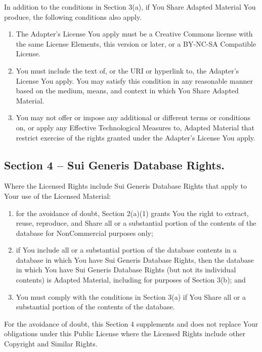 \documentclass[]{book}
\begin{document}
In addition to the conditions in Section 3(a), if You Share Adapted
Material You produce, the following conditions also apply.

\begin{enumerate}
\def\labelenumi{\arabic{enumi}.}
\item
  The Adapter's License You apply must be a Creative Commons license
  with the same License Elements, this version or later, or a BY-NC-SA
  Compatible License.
\item
  You must include the text of, or the URI or hyperlink to, the
  Adapter's License You apply. You may satisfy this condition in any
  reasonable manner based on the medium, means, and context in which You
  Share Adapted Material.
\item
  You may not offer or impose any additional or different terms or
  conditions on, or apply any Effective Technological Measures to,
  Adapted Material that restrict exercise of the rights granted under
  the Adapter's License You apply.
\end{enumerate}

\subsection{Section 4 -- Sui Generis Database
Rights.}\label{section-4-sui-generis-database-rights.}

Where the Licensed Rights include Sui Generis Database Rights that apply
to Your use of the Licensed Material:

\begin{enumerate}
\def\labelenumi{\alph{enumi}.}
\item
  for the avoidance of doubt, Section 2(a)(1) grants You the right to
  extract, reuse, reproduce, and Share all or a substantial portion of
  the contents of the database for NonCommercial purposes only;
\item
  if You include all or a substantial portion of the database contents
  in a database in which You have Sui Generis Database Rights, then the
  database in which You have Sui Generis Database Rights (but not its
  individual contents) is Adapted Material, including for purposes of
  Section 3(b); and
\item
  You must comply with the conditions in Section 3(a) if You Share all
  or a substantial portion of the contents of the database.
\end{enumerate}

For the avoidance of doubt, this Section 4 supplements and does not
replace Your obligations under this Public License where the Licensed
Rights include other Copyright and Similar Rights.
\end{document}
